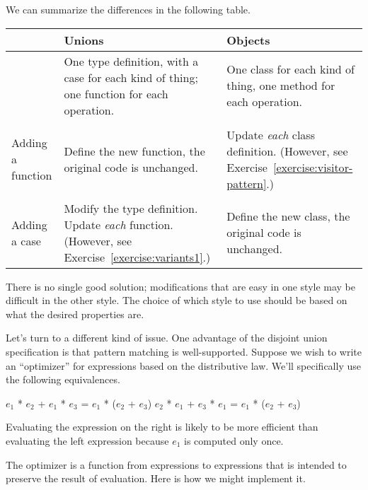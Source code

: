 We can summarize the differences in the following table.

\begin{center}
\begin{tabular}{|l|p{1.5in}|p{1.5in}|}
\hline
& Unions & Objects\\
\hline
& One type definition, with a case for each kind of thing;
  one function for each operation.
& One class for each kind of thing, one method for each operation.\\
& & \\
Adding a function
& Define the new function, the original code is unchanged.
& Update \emph{each} class definition. (However, see Exercise~\ref{exercise:visitor-pattern}.)\\
& & \\
Adding a case
& Modify the type definition.  Update \emph{each} function.  (However, see Exercise~\ref{exercise:variants1}.)
& Define the new class, the original code is unchanged.\\
\hline
\end{tabular}
\end{center}
%
There is no single good solution; modifications that are easy in one
style may be difficult in the other style.  The choice of which style
to use should be based on what the desired properties are.


Let's turn to a different kind of issue.  One advantage of the
disjoint union specification is that pattern matching is
well-supported.  Suppose we wish to write an ``optimizer'' for
expressions based on the distributive law.  We'll specifically use the
following equivalences.

\begin{ocaml}
$e_1$ * $e_2$ + $e_1$ * $e_3$ = $e_1$ * ($e_2$ + $e_3$)
$e_2$ * $e_1$ + $e_3$ * $e_1$ = $e_1$ * ($e_2$ + $e_3$)
\end{ocaml}
%
Evaluating the expression on the right is likely to be more efficient
than evaluating the left expression because $e_1$ is computed only once.

The optimizer is a function from expressions to expressions that is
intended to preserve the result of evaluation.  Here is how we might
implement it.


